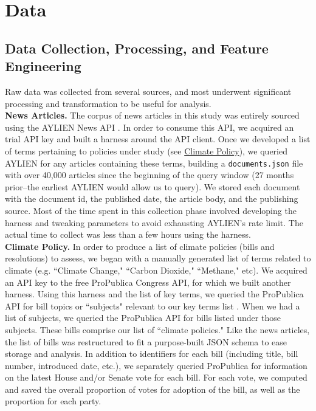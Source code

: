 \documentclass[letterpaper,11pt]{article}
\begin{document}

\section{Data}

\vspace{.1in}

\subsection{Data Collection, Processing, and Feature Engineering}
Raw data was collected from several sources, and most underwent significant processing and transformation to be useful for analysis.\\

\quad\textbf{News Articles.} The corpus of news articles in this study was entirely sourced using the AYLIEN News API \cite{aylien}. In order to consume this API, we acquired an trial API key and built a harness around the API client. Once we developed a list of terms pertaining to policies under study (see \hyperref[dcap:ClimatePol]{Climate Policy}), we queried AYLIEN for any articles containing these terms, building a \verb|documents.json| file with over 40,000 articles since the beginning of the query window (27 months prior--the earliest AYLIEN would allow us to query). We stored each document with the document id, the published date, the article body, and the publishing source. Most of the time spent in this collection phase involved developing the harness and tweaking parameters to avoid exhausting AYLIEN's rate limit. The actual time to collect was less than a few hours using the harness.\\

\textbf{Climate Policy.}\label{dcap:ClimatePol} In order to produce a list of climate policies (bills and resolutions) to assess, we began with a manually generated list of terms related to climate (e.g. ``Climate Change," ``Carbon Dioxide," ``Methane," etc). We acquired an API key to the free ProPublica Congress API, for which we built another harness. Using this harness and the list of key terms, we queried the ProPublica API for bill topics or ``subjects" relevant to our key terms list \cite{propublica_congress_api}. When we had a list of subjects, we queried the ProPublica API for bills listed under those subjects. These bills comprise our list of ``climate policies." Like the news articles, the list of bills was restructured to fit a purpose-built JSON schema to ease storage and analysis. In addition to identifiers for each bill (including title, bill number, introduced date, etc.), we separately queried ProPublica for information on the latest House and/or Senate vote for each bill. For each vote, we computed and saved the overall proportion of votes for adoption of the bill, as well as the proportion for each party.
\end{document}
